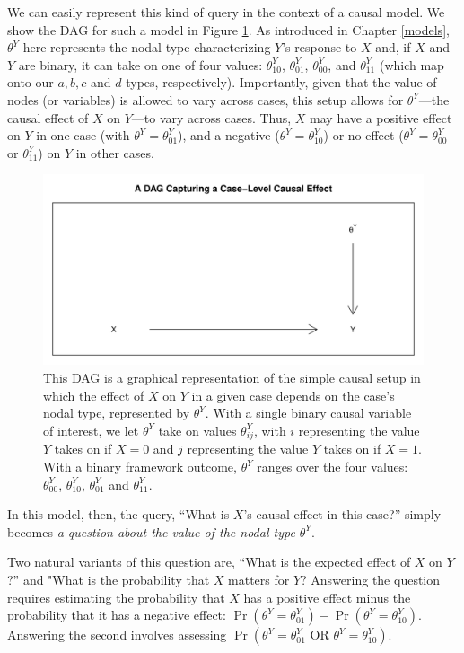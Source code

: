 \documentclass[
  12pt,
]{book}
\begin{document}
We can easily represent this kind of query in the context of a causal model. We show the DAG for such a model in Figure \ref{fig:casequery}. As introduced in Chapter \ref{models}, \(\theta^Y\) here represents the nodal type characterizing \(Y\)'s response to \(X\) and, if \(X\) and \(Y\) are binary, it can take on one of four values: \(\theta^Y_{10}\), \(\theta^Y_{01}\), \(\theta^Y_{00}\), and \(\theta^Y_{11}\) (which map onto our \(a, b, c\) and \(d\) types, respectively). Importantly, given that the value of nodes (or variables) is allowed to vary across cases, this setup allows for \(\theta^Y\)---the causal effect of \(X\) on \(Y\)---to vary across cases. Thus, \(X\) may have a positive effect on \(Y\) in one case (with \(\theta^Y=\theta^Y_{01}\)), and a negative (\(\theta^Y=\theta^Y_{10}\)) or no effect (\(\theta^Y=\theta^Y_{00}\) or \(\theta^Y_{11}\)) on \(Y\) in other cases.

\begin{figure}

{\centering \includegraphics[width=0.6\linewidth]{ii_files/figure-latex/casequery-1} 

}

\caption{This DAG is a graphical representation of the simple causal setup in which the effect of $X$ on $Y$ in a given case depends on the case's nodal type, represented by $\theta^Y$. With a single binary causal variable of interest, we let $\theta^Y$ take on values $\theta^Y_{ij}$, with $i$ representing the value $Y$ takes on if $X=0$ and $j$ representing the value $Y$ takes on if $X=1$. With a binary framework outcome, $\theta^Y$ ranges over the four values: $\theta^Y_{00}$, $\theta^Y_{10}$, $\theta^Y_{01}$ and $\theta^Y_{11}$.}\label{fig:casequery}
\end{figure}

In this model, then, the query, ``What is \(X\)'s causal effect in this case?'' simply becomes \emph{a question about the value of the nodal type \(\theta^Y\)}.

Two natural variants of this question are, ``What is the expected effect of \(X\) on \(Y\)?'' and "What is the probability that \(X\) matters for \(Y\)? Answering the question requires estimating the probability that \(X\) has a positive effect minus the probability that it has a negative effect: \(\Pr(\theta^Y = \theta^Y_{01}) - \Pr(\theta^Y = \theta^Y_{10})\). Answering the second involves assessing \(\Pr(\theta^Y = \theta^Y_{01} \text{ OR } \theta^Y = \theta^Y_{10})\).
\end{document}
